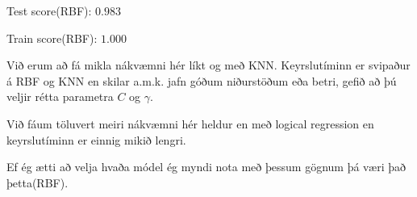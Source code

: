 \documentclass[11pt]{article}
\begin{document}
    Test score(RBF): \(0.983\)

Train score(RBF): \(1.000\)

Við erum að fá mikla nákvæmni hér líkt og með KNN. Keyrslutíminn er
svipaður á RBF og KNN en skilar a.m.k. jafn góðum niðurstöðum eða betri,
gefið að þú veljir rétta parametra \(C\) og \(\gamma\).

Við fáum töluvert meiri nákvæmni hér heldur en með logical regression en
keyrslutíminn er einnig mikið lengri.

Ef ég ætti að velja hvaða módel ég myndi nota með þessum gögnum þá væri
það þetta(RBF).


    
    
    
    
\end{document}
